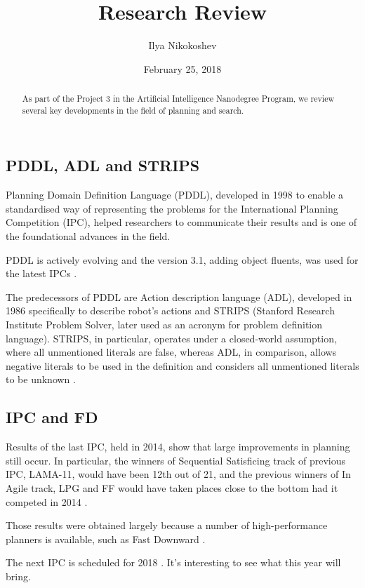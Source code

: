 \documentclass[11pt]{article}   	%
\title{Research Review}
\author{Ilya Nikokoshev}
\date{February 25, 2018}
\begin{document}
\maketitle

\begin{abstract}
As part of the Project 3 in the Artificial Intelligence Nanodegree Program, we review several key developments in the field of planning and search.
\end{abstract}


\subsection*{PDDL, ADL and STRIPS}

Planning Domain Definition Language (PDDL), developed in 1998 to enable a standardised way of representing the problems for the International Planning Competition (IPC), helped researchers to communicate their results and is one of the foundational advances in the field. 

PDDL is actively evolving and the version 3.1, adding object fluents, was used for the latest IPCs \cite{PDDL, ICAPS}.

The predecessors of PDDL are Action description language (ADL), developed in 1986 specifically to describe robot's actions and STRIPS (Stanford Research Institute Problem Solver, later used as an acronym for problem definition language). STRIPS, in particular, operates under a closed-world assumption, where all unmentioned literals are false, whereas ADL, in comparison, allows negative literals to be used in the definition and considers all unmentioned literals to be unknown \cite{ADL}.


\subsection*{IPC and FD}

Results of the last IPC, held in 2014, show that large improvements in planning still occur. In particular, the winners of Sequential Satisficing track of previous IPC, LAMA-11, would have been 12th out of 21, and the previous winners of In Agile track, LPG and FF would have taken places close to the bottom had it competed in 2014 \cite{IPC14}.

Those results were obtained largely because a number of high-performance planners is available, such as Fast Downward \cite{IPC14, FD}.

The next IPC is scheduled for 2018 \cite{IPC18}. It's interesting to see what this year will bring.
\end{document}
